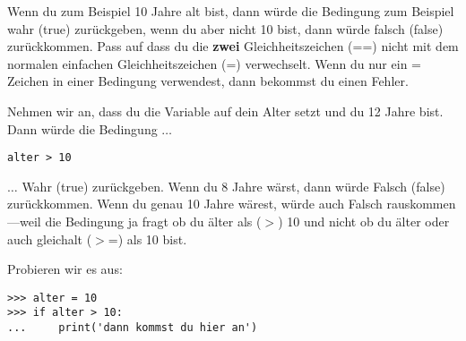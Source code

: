 Wenn du zum Beispiel 10 Jahre alt bist, dann würde die Bedingung  zum Beispiel wahr (true) zurückgeben, wenn du aber nicht 10 bist, dann würde falsch (false) zurückkommen. Pass auf dass du die \textbf{zwei} Gleichheitszeichen (==) nicht mit dem normalen einfachen Gleichheitszeichen (=) verwechselt. Wenn du nur ein = Zeichen in einer Bedingung verwendest, dann bekommst du einen Fehler.
\par
Nehmen wir an, dass du die Variable  auf dein Alter setzt und du 12 Jahre bist. Dann würde die Bedingung $\ldots$

\begin{Verbatim}[frame=single]
alter > 10
\end{Verbatim}

$\ldots$ Wahr (true) zurückgeben. Wenn du 8 Jahre wärst, dann würde Falsch (false) zurückkommen. Wenn du genau 10 Jahre wärest, würde auch Falsch rauskommen---weil die Bedingung ja fragt ob du älter als ($>$) 10 und nicht ob du älter oder auch gleichalt ($>$=) als 10 bist.

Probieren wir es aus:

\begin{Verbatim}[frame=single]
>>> alter = 10
>>> if alter > 10:
...     print('dann kommst du hier an')
\end{Verbatim}

